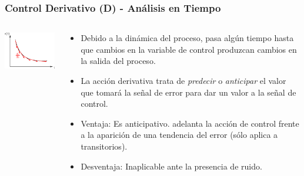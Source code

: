 \documentclass[aspectratio=169,handout]{beamer}
\theoremstyle{definition}
\theoremstyle{plain}
\theoremstyle{remark}
\begin{document}
\begin{frame}[<+->]\frametitle{Control Derivativo (D) - Análisis en Tiempo}
\begin{columns}
\begin{column}{0.3\textwidth}
\begin{center}
  \includegraphics[width=5cm]{images/Dcontroller_time.eps}
\end{center}
\end{column} 
\begin{column}{0.7\textwidth}
  \begin{itemize}
    \item Debido a la dinámica del proceso, pasa algún tiempo hasta que cambios en la variable de control produzcan cambios en la salida del proceso.
    \item La acción derivativa trata de \textit{predecir} o \textit{anticipar} el valor que tomará la señal de error para dar un valor a la señal de control.
    \item Ventaja: Es anticipativo. adelanta la acción de control frente a la aparición de una tendencia del error (sólo aplica a transitorios).
    \item Desventaja: Inaplicable ante la presencia de ruido.
  \end{itemize}
\end{column} 
\end{columns}
\end{frame}
\end{document}
